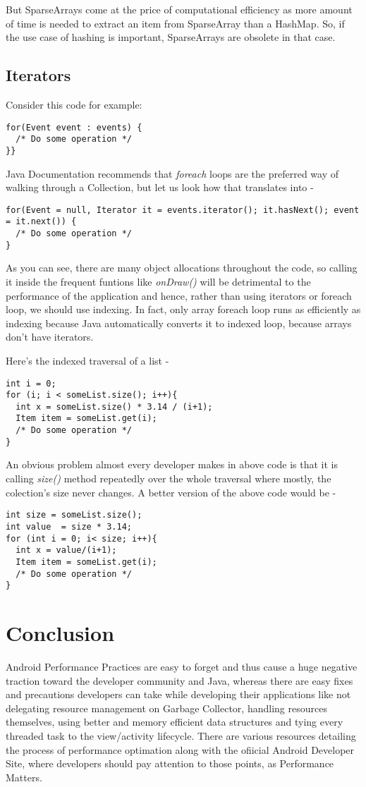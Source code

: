 \documentclass[journal]{IEEEtran}
\begin{document}
But SparseArrays come at the price of computational efficiency as more amount of time is needed to extract an item from SparseArray than a HashMap. So, if the use case of hashing is important, SparseArrays are obsolete in that case.

\subsection{Iterators}
Consider this code for example:
\begin{verbatim}
for(Event event : events) {
  /* Do some operation */
}}
\end{verbatim}

Java Documentation recommends that \textit{foreach} loops are the preferred way of walking through a Collection, but let us look how that translates into -
\begin{verbatim}
for(Event = null, Iterator it = events.iterator(); it.hasNext(); event = it.next()) {
  /* Do some operation */
}
\end{verbatim}
As you can see, there are many object allocations throughout the code, so calling it inside the frequent funtions like \textit{onDraw()} will be detrimental to the performance of the application and hence, rather than using iterators or foreach loop, we should use indexing. In fact, only array foreach loop runs as efficiently as indexing because Java automatically converts it to indexed loop, because arrays don't have iterators.

Here's the indexed traversal of a list -
\begin{verbatim}
int i = 0;
for (i; i < someList.size(); i++){
  int x = someList.size() * 3.14 / (i+1);
  Item item = someList.get(i);
  /* Do some operation */
} 
\end{verbatim}
An obvious problem almost every developer makes in above code is that it is calling \textit{size()} method repeatedly over the whole traversal where mostly, the colection's size never changes. A better version of the above code would be - 
\begin{verbatim}
int size = someList.size();
int value  = size * 3.14;
for (int i = 0; i< size; i++){
  int x = value/(i+1);
  Item item = someList.get(i);
  /* Do some operation */	
}
\end{verbatim}

\section{Conclusion}
Android Performance Practices are easy to forget and thus cause a huge negative traction toward the developer community and Java, whereas there are easy fixes and precautions developers can take while developing their applications like not delegating resource management on Garbage Collector, handling resources themselves, using better and memory efficient data structures and tying every threaded task to the view/activity lifecycle. There are various resources detailing the process of performance optimation along with the ofiicial Android Developer Site, where developers should pay attention to those points, as Performance Matters.
\end{document}
